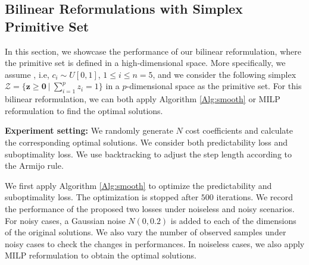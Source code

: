 \documentclass{article}
\def\Z{\mathcal{Z}}
\def\z{\bm{z}}
\theoremstyle{plain}
\begin{document}
\subsection{Bilinear Reformulations with Simplex Primitive Set}\label{sec:pro:bi}

In this section, we showcase the performance of our bilinear reformulation, where the primitive set is defined in a high-dimensional space. More specifically, we assume , i.e, $c_i \sim U[0,1]$, $1 \leq i \leq n = 5$, and we consider the following simplex $\Z = \big\{\z \geqslant \bm 0 ~\big|~ \sum_{i=1}^p z_i = 1 \big\}$ in a $p$-dimensional space as the primitive set. For this  bilinear reformulation, we can both apply Algorithm \ref{Alg:smooth} or MILP reformulation to find the optimal solutions.


\textbf{Experiment setting:} We randomly generate $N$ cost coefficients and calculate the corresponding optimal solutions. We consider both predictability loss and suboptimality loss. We use backtracking to adjust the step length according to the Armijo rule.

We first apply Algorithm \ref{Alg:smooth} to optimize the predictability and suboptimality loss. The optimization is stopped after $500$ iterations.
We record the performance of the proposed two losses under noiseless and noisy scenarios. For noisy cases, a Gaussian noise $N(0,0.2)$ is added to each of the dimensions of the original solutions. We also vary the number of observed samples under noisy cases to check the changes in performances. In noiseless cases, we also apply MILP reformulation to obtain the optimal solutions.
\end{document}
